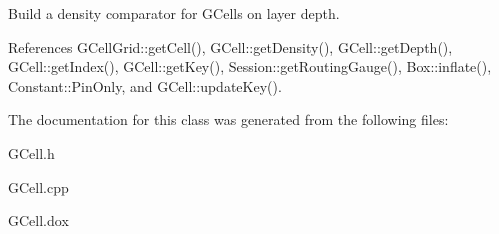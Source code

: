 Build a density comparator for G\+Cells on layer {\ttfamily depth}. 

References G\+Cell\+Grid\+::get\+Cell(), G\+Cell\+::get\+Density(), G\+Cell\+::get\+Depth(), G\+Cell\+::get\+Index(), G\+Cell\+::get\+Key(), Session\+::get\+Routing\+Gauge(), Box\+::inflate(), Constant\+::\+Pin\+Only, and G\+Cell\+::update\+Key().



The documentation for this class was generated from the following files\+:\begin{DoxyCompactItemize}
\item 
G\+Cell.\+h\item 
G\+Cell.\+cpp\item 
G\+Cell.\+dox\end{DoxyCompactItemize}
